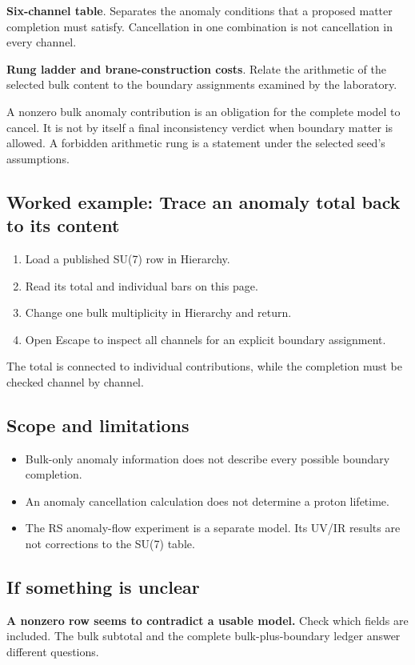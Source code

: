 \documentclass[11pt,a4paper]{article}
\begin{document}
\textbf{Six-channel table}. Separates the anomaly conditions that a proposed matter completion must satisfy. Cancellation in one combination is not cancellation in every channel.

\textbf{Rung ladder and brane-construction costs}. Relate the arithmetic of the selected bulk content to the boundary assignments examined by the laboratory.

A nonzero bulk anomaly contribution is an obligation for the complete model to cancel. It is not by itself a final inconsistency verdict when boundary matter is allowed. A forbidden arithmetic rung is a statement under the selected seed's assumptions.
\subsection*{Worked example: Trace an anomaly total back to its content}
\begin{enumerate}
\item Load a published SU(7) row in Hierarchy.
\item Read its total and individual bars on this page.
\item Change one bulk multiplicity in Hierarchy and return.
\item Open Escape to inspect all channels for an explicit boundary assignment.
\end{enumerate}
The total is connected to individual contributions, while the completion must be checked channel by channel.
\subsection*{Scope and limitations}
\begin{itemize}
\item Bulk-only anomaly information does not describe every possible boundary completion.
\item An anomaly cancellation calculation does not determine a proton lifetime.
\item The RS anomaly-flow experiment is a separate model. Its UV/IR results are not corrections to the SU(7) table.
\end{itemize}
\subsection*{If something is unclear}
\textbf{A nonzero row seems to contradict a usable model.} Check which fields are included. The bulk subtotal and the complete bulk-plus-boundary ledger answer different questions.
\end{document}
